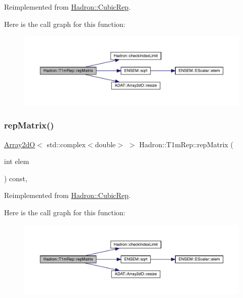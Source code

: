 Reimplemented from \mbox{\hyperlink{structHadron_1_1CubicRep_ac5d7e9e6f4ab1158b5fce3e4ad9e8005}{Hadron\+::\+Cubic\+Rep}}.

Here is the call graph for this function\+:
\nopagebreak
\begin{figure}[H]
\begin{center}
\leavevmode
\includegraphics[width=350pt]{de/dd9/structHadron_1_1T1mRep_a77a8ee94e1ed9406845c8d1106f73599_cgraph}
\end{center}
\end{figure}
\mbox{\label{structHadron_1_1T1mRep_a77a8ee94e1ed9406845c8d1106f73599}} 
\subsubsection{\texorpdfstring{repMatrix()}{repMatrix()}\hspace{0.1cm}{\footnotesize\ttfamily [3/3]}}
{\footnotesize\ttfamily \mbox{\hyperlink{classADAT_1_1Array2dO}{Array2dO}}$<$ std\+::complex$<$double$>$ $>$ Hadron\+::\+T1m\+Rep\+::rep\+Matrix (\begin{DoxyParamCaption}\item[{int}]{elem }\end{DoxyParamCaption}) const\hspace{0.3cm}{\ttfamily [inline]}, {\ttfamily [virtual]}}



Reimplemented from \mbox{\hyperlink{structHadron_1_1CubicRep_ac5d7e9e6f4ab1158b5fce3e4ad9e8005}{Hadron\+::\+Cubic\+Rep}}.

Here is the call graph for this function\+:
\nopagebreak
\begin{figure}[H]
\begin{center}
\leavevmode
\includegraphics[width=350pt]{de/dd9/structHadron_1_1T1mRep_a77a8ee94e1ed9406845c8d1106f73599_cgraph}
\end{center}
\end{figure}


